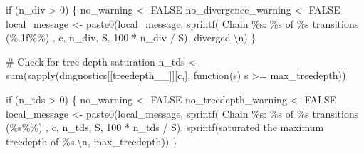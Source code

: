 \documentclass[
  letterpaper,
  DIV=11,
  numbers=noendperiod]{scrartcl}
\newenvironment{Shaded}{\begin{snugshade}}{\end{snugshade}}
\newcommand{\BuiltInTok}[1]{\textcolor[rgb]{0.00,0.23,0.31}{#1}}
\newcommand{\CharTok}[1]{\textcolor[rgb]{0.13,0.47,0.30}{#1}}
\newcommand{\CommentTok}[1]{\textcolor[rgb]{0.37,0.37,0.37}{#1}}
\newcommand{\ControlFlowTok}[1]{\textcolor[rgb]{0.00,0.23,0.31}{#1}}
\newcommand{\DecValTok}[1]{\textcolor[rgb]{0.68,0.00,0.00}{#1}}
\newcommand{\NormalTok}[1]{\textcolor[rgb]{0.00,0.23,0.31}{#1}}
\newcommand{\OperatorTok}[1]{\textcolor[rgb]{0.37,0.37,0.37}{#1}}
\newcommand{\SpecialCharTok}[1]{\textcolor[rgb]{0.37,0.37,0.37}{#1}}
\newcommand{\StringTok}[1]{\textcolor[rgb]{0.13,0.47,0.30}{#1}}
\begin{document}
\begin{Shaded}
\begin{Highlighting}[]
    \ControlFlowTok{if}\NormalTok{ (n\_div }\OperatorTok{\textgreater{}} \DecValTok{0}\NormalTok{) \{}
\NormalTok{      no\_warning }\OperatorTok{\textless{}{-}}\NormalTok{ FALSE}
\NormalTok{      no\_divergence\_warning }\OperatorTok{\textless{}{-}}\NormalTok{ FALSE}
\NormalTok{      local\_message }\OperatorTok{\textless{}{-}} 
\NormalTok{        paste0(local\_message,}
\NormalTok{               sprintf(}\StringTok{\textquotesingle{}  Chain }\SpecialCharTok{\%s}\StringTok{: }\SpecialCharTok{\%s}\StringTok{ of }\SpecialCharTok{\%s}\StringTok{ transitions (}\SpecialCharTok{\%.1f\%\%}\StringTok{) \textquotesingle{}}\NormalTok{, }
\NormalTok{                       c, n\_div, S, }\DecValTok{100} \OperatorTok{*}\NormalTok{ n\_div }\OperatorTok{/}\NormalTok{ S),}
               \StringTok{\textquotesingle{}diverged.}\CharTok{\textbackslash{}n}\StringTok{\textquotesingle{}}\NormalTok{)}
\NormalTok{    \}}
    
    \CommentTok{\# Check for tree depth saturation}
\NormalTok{    n\_tds }\OperatorTok{\textless{}{-}} \BuiltInTok{sum}\NormalTok{(sapply(diagnostics[[}\StringTok{\textquotesingle{}treedepth\_\_\textquotesingle{}}\NormalTok{]][c,], }
\NormalTok{                        function(s) s }\OperatorTok{\textgreater{}=}\NormalTok{ max\_treedepth))}
    
    \ControlFlowTok{if}\NormalTok{ (n\_tds }\OperatorTok{\textgreater{}} \DecValTok{0}\NormalTok{) \{}
\NormalTok{      no\_warning }\OperatorTok{\textless{}{-}}\NormalTok{ FALSE}
\NormalTok{      no\_treedepth\_warning }\OperatorTok{\textless{}{-}}\NormalTok{ FALSE}
\NormalTok{      local\_message }\OperatorTok{\textless{}{-}} 
\NormalTok{        paste0(local\_message,}
\NormalTok{               sprintf(}\StringTok{\textquotesingle{}  Chain }\SpecialCharTok{\%s}\StringTok{: }\SpecialCharTok{\%s}\StringTok{ of }\SpecialCharTok{\%s}\StringTok{ transitions (}\SpecialCharTok{\%s\%\%}\StringTok{) \textquotesingle{}}\NormalTok{, }
\NormalTok{                       c, n\_tds, S, }\DecValTok{100} \OperatorTok{*}\NormalTok{ n\_tds }\OperatorTok{/}\NormalTok{ S),}
\NormalTok{               sprintf(}\StringTok{\textquotesingle{}saturated the maximum treedepth of }\SpecialCharTok{\%s}\StringTok{.}\CharTok{\textbackslash{}n}\StringTok{\textquotesingle{}}\NormalTok{, }
\NormalTok{                       max\_treedepth))}
\NormalTok{    \}}
    

\end{Highlighting}
\end{Shaded}
\end{document}
